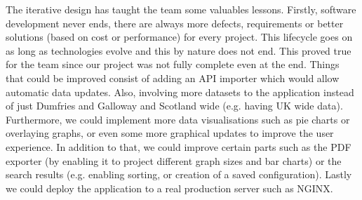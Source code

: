 \documentclass{l3proj}
\begin{document}
The iterative design has taught the team some valuables lessons. Firstly, software development never ends, there are
always more defects, requirements or better solutions (based on cost or performance) for every project. This lifecycle goes
on as long as technologies evolve and this by nature does not end. This proved true for the team since our project was
not fully complete even at the end. Things that could be improved consist of adding an API importer which would allow
automatic data updates. Also, involving more datasets to the application instead of just Dumfries and Galloway and
Scotland wide (e.g. having UK wide data). Furthermore, we could implement more data visualisations such as pie charts
or overlaying graphs, or even some more graphical updates to improve the user experience. In addition to that, we could
improve certain parts such as the PDF exporter (by enabling it to project different graph sizes and bar charts) or the
search results (e.g. enabling sorting, or creation of a saved configuration). Lastly we could deploy the application to a
real production server such as NGINX.





\end{document}
